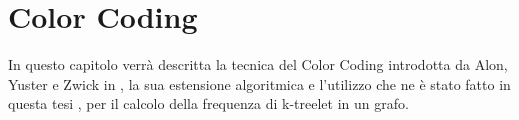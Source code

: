 \chapter{Color Coding}

In questo capitolo verr\`a descritta la tecnica del Color Coding introdotta da Alon, Yuster e Zwick  in \cite{alon1995color} , la sua estensione algoritmica e l'utilizzo che ne \`e stato fatto in questa tesi , per il calcolo della frequenza di k-treelet in un grafo.

